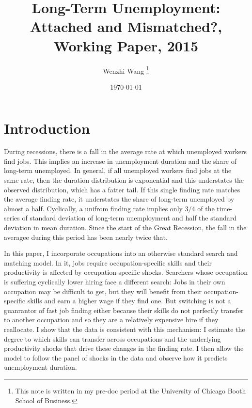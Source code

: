 \documentclass[12pt]{article}
\newcommand{\highlightB}[1]{{\emph{\color{MyBlue}{#1}}}}
\newcommand{\highlightP}[1]{{\emph{\color{MyPink}{#1}}}}
\theoremstyle{definition}
\begin{document}
 


\title{\bf Long-Term Unemployment: Attached and Mismatched?, Working Paper, 2015} 
\author{Wenzhi Wang \thanks{This note is written in my pre-doc period at the University of Chicago Booth School of Business.} } 
\date{\today} 
\maketitle 


\citet{wiczerLongTermUnemploymentAttached2015}


\section{Introduction}

During recessions, there is a fall in the average rate at which unemployed workers find jobs. This implies an increase in unemployment duration and the share of long-term unemployed. \highlightB{However, the observed rise in unemployment duration during recessions outpaces the fall in the average finding rate.} In general, if all unemployed workers find jobs at the same rate, then the duration distribution is exponential and this understates the observed distribution, which has a fatter tail. If this single finding rate matches the average finding rate, it understates the share of long-term unemployed by almost a half. Cyclically, a unifrom finding rate implies only $3/4$ of the time-series of standard deviation of long-term unemployment and half the standard deviation in mean duration. Since the start of the Great Recession, the fall in the averagee during this period has been nearly twice that. \highlightP{Instead, one must allow for heterogeneity -- some workers will take much longer to find a job than others.}

In this paper, I incorporate occupations into an otherwise standard search and matching model. In it, jobs require occupation-specific skills and their productivity is affected by occupation-specific shocks. Searchers whose occupation is suffering cyclically lower hiring face a different search: Jobs in their own occupation may be difficult to get, but they will benefit from their occupation-specific skills and earn a higher wage if they find one. But switching is not a guanrantor of fast job finding either because their skills do not perfectly transfer to another occupation and so they are a relatively expensive hire if they reallocate. I show that the data is consistent with this mechanism: \highlightP{Unemployed workers transiting across occupations experience wage losses on average and also there are sizeable differences in the job finding rate across occupation and this dispersion is counter-cyclical.} I estimate the degree to which skills can transfer across occupations and the underlying productivity shocks that drive these changes in the finding rate. I then allow the model to follow the panel of shocks in the data and observe how it predicts unemployment duration.
\end{document}
